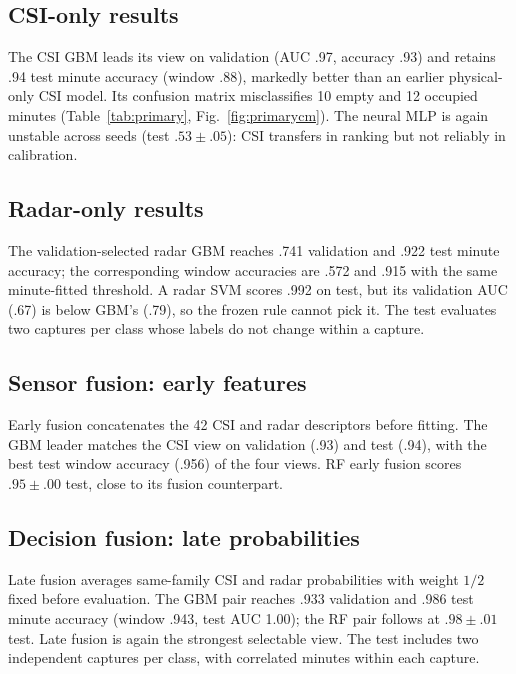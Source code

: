 \documentclass[conference,10pt,letterpaper]{IEEEtran}
\begin{document}
\subsection{CSI-only results}
The CSI GBM leads its view on validation (AUC .97, accuracy .93) and retains .94 test minute accuracy (window .88), markedly better than an earlier physical-only CSI model. Its confusion matrix misclassifies 10 empty and 12 occupied minutes (Table~\ref{tab:primary}, Fig.~\ref{fig:primarycm}). The neural MLP is again unstable across seeds (test $.53\pm.05$): CSI transfers in ranking but not reliably in calibration.

\subsection{Radar-only results}
The validation-selected radar GBM reaches .741 validation and .922 test minute accuracy; the corresponding window accuracies are .572 and .915 with the same minute-fitted threshold. A radar SVM scores .992 on test, but its validation AUC (.67) is below GBM's (.79), so the frozen rule cannot pick it. The test evaluates two captures per class whose labels do not change within a capture.

\subsection{Sensor fusion: early features}
Early fusion concatenates the 42 CSI and radar descriptors before fitting. The GBM leader matches the CSI view on validation (.93) and test (.94), with the best test window accuracy (.956) of the four views. RF early fusion scores $.95\pm.00$ test, close to its fusion counterpart.

\subsection{Decision fusion: late probabilities}
Late fusion averages same-family CSI and radar probabilities with weight $1/2$ fixed before evaluation. The GBM pair reaches .933 validation and .986 test minute accuracy (window .943, test AUC 1.00); the RF pair follows at $.98\pm.01$ test. Late fusion is again the strongest selectable view. The test includes two independent captures per class, with correlated minutes within each capture.
\end{document}
